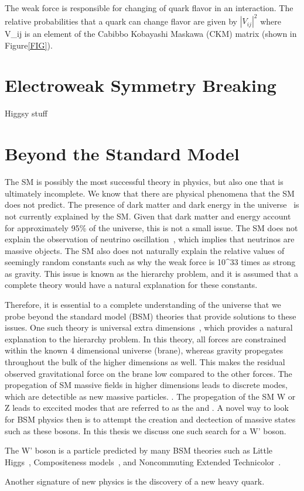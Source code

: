 The weak force is responsible for changing of quark flavor in an interaction.  
The relative probabilities that a quark can change flavor are given by $|V_{ij}|^2$ where V_{ij} is an element of the Cabibbo Kobayashi Maskawa (CKM) matrix (shown in Figure\ref{FIG}). 

\section{Electroweak Symmetry Breaking}
Higgsy stuff

\section{Beyond the Standard Model}
The SM is possibly the most successful theory in physics, but also one that is ultimately incomplete.  
We know that there are physical phenomena that the SM does not predict.  
The presence of dark matter and dark energy in the universe~\cite{CITE} is not currently explained by the SM.  
Given that dark matter and energy account for approximately 95\% of the universe, this is not a small issue.  
The SM does not explain the observation of neutrino oscillation~\cite{CITE}, which implies that neutrinos are massive objects.  
The SM also does not naturally explain the relative values of seemingly random constants such as why the weak force is 10^33 times as strong as gravity.  
This issue is known as the hierarchy problem, and it is assumed that a complete theory would have a natural explanation for these constants.  

Therefore, it is essential to a complete understanding of the universe that we probe beyond the standard model (BSM) theories that provide solutions to these issues.  
One such theory is universal extra dimensions~\cite{CITE}, which provides a natural explanation to the hierarchy problem.  
In this theory, all forces are constrained within the known 4 dimensional universe (brane), whereas gravity propegates throughout the bulk of the higher dimensions as well.  
This makes the residual observed gravitational force on the brane low compared to the other forces.  
The propegation of SM massive fields in higher dimensions leads to discrete modes, which are detectible as new massive particles.   .
The propegation of the SM W or Z leads to exccited modes that are referred to as the \wp and \zp.
A novel way to look for BSM physics then is to attempt the creation and dectection of massive states such as these bosons. 
In this thesis we discuss one such search for a W' boson.  

The W' boson is a particle predicted by many BSM theories such as Little Higgs~\cite{CITE}, Compositeness models~\cite{CITE}, and Noncommuting Extended Technicolor~\cite{CITE}.  

Another signature of new physics is the discovery of a new heavy quark.    


 



